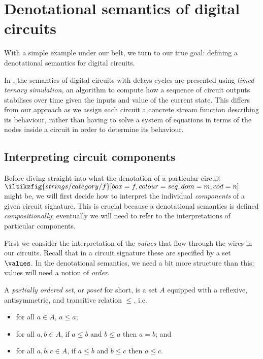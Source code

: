 \section{Denotational semantics of digital circuits}

With a simple example under our belt, we turn to our true goal: defining a
denotational semantics for digital circuits.

\begin{remark}
    In \cite{mendler2012constructive}, the semantics of digital circuits with
    delays cycles are presented using \emph{timed ternary simulation}, an
    algorithm to compute how a sequence of circuit outputs stabilises over time
    given the inputs and value of the current state.
    This differs from our approach as we assign each circuit a concrete stream
    function describing its behaviour, rather than having to solve a system of
    equations in terms of the nodes inside a circuit in order to determine its
    behaviour.
\end{remark}

\subsection{Interpreting circuit components}

Before diving straight into what the denotation of a particular circuit \(
    \iltikzfig{strings/category/f}[box=f,colour=seq,dom=m,cod=n]
\) might be, we will first decide how to interpret the individual
\emph{components} of a given circuit signature.
This is crucial because a denotational semantics is defined
\emph{compositionally}; eventually we will need to refer to the interpretations
of particular components.

First we consider the interpretation of the \emph{values} that flow through the
wires in our circuits.
Recall that in a circuit signature these are specified by a set \(\values\).
In the denotational semantics, we need a bit more structure than this; values
will need a notion of \emph{order}.

\begin{definition}
    A \emph{partially ordered set}, or \emph{poset} for short, is a set \(A\)
    equipped with a reflexive, antisymmetric, and transitive relation \(\leq\),
    i.e.\
    \begin{itemize}
        \item for all \(a \in A\), \(a \leq a\);
        \item for all \(a, b \in A\), if \(a \leq b\) and \(b \leq a\) then
                \(a = b\); and
        \item for all \(a, b, c \in A\), if \(a \leq b\) and \(b \leq c\) then
                \(a \leq c\).
    \end{itemize}
\end{definition}

